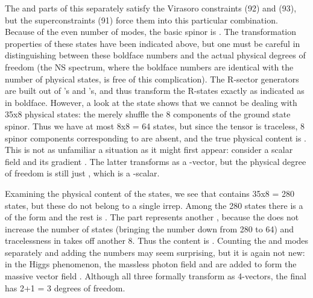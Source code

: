 \documentclass[a4paper,a4paper]{article}
\begin{document}
The \myHighlight{$\alpha \alpha$}\coordHE{} and \coordHE{} parts of this separately satisfy the
Virasoro constraints (92) and (93), but the superconstraints (91) force
them into this particular combination. Because of the even number
of \coordHE{} modes, the basic spinor is \coordHE{}.
The \coordHE{} transformation properties of these states have been indicated
above, but one must be careful in distinguishing between these boldface
numbers and the actual physical degrees of freedom (the
NS spectrum, where the boldface numbers are identical with the
number of physical states, is free of this complication).
The R-sector \coordHE{} generators are built out of \coordHE{}'s
and \coordHE{}'s, and thus transform the R-states exactly as indicated as
in boldface.  However, a look at the \coordHE{} state shows that we cannot be
dealing with 35x8 physical states: the \coordHE{} merely shuffle the 8
components of the ground state spinor.  Thus we have at most 8x8 = 64
states, but since the tensor is traceless, 8 spinor components
corresponding to \coordHE{} are absent, and the true physical
content is \coordHE{}.  This is not as unfamiliar a situation as it
might first appear: consider a scalar field \myHighlight{$\theta$}\coordHE{} and its gradient
\myHighlight{$\partial_{\mu}\theta$}\coordHE{}.  The latter transforms as a \coordHE{}-vector, but the
physical degree of freedom is still just \myHighlight{$\theta$}\coordHE{}, which is a \coordHE{}-scalar.

Examining the physical content of the \coordHE{} states, we see that
\coordHE{} contains 35x8 = 280 states,
but these do not belong to a single irrep.  Among the 280 states there is
a \coordHE{} of the form \coordHE{} and the rest is \coordHE{}.  The part
\coordHE{} represents another \coordHE{},
because the \coordHE{} does not increase the number of states
(bringing the number down from 280 to 64) and tracelessness in \coordHE{}
takes off another 8.  Thus the \coordHE{} content is \coordHE{}.  Counting the \myHighlight{$\alpha$}\coordHE{} and \coordHE{} modes separately
and adding the numbers may seem surprising, but it is again not new: in
the Higgs phenomenon, the massless photon field \coordHE{} and
\myHighlight{$\partial_{\mu}\theta$}\coordHE{} are added to form the massive vector
field \coordHE{}.  Although all three formally transform as 4-vectors,
the final \coordHE{} has 2+1 = 3 degrees of freedom.
\end{document}
